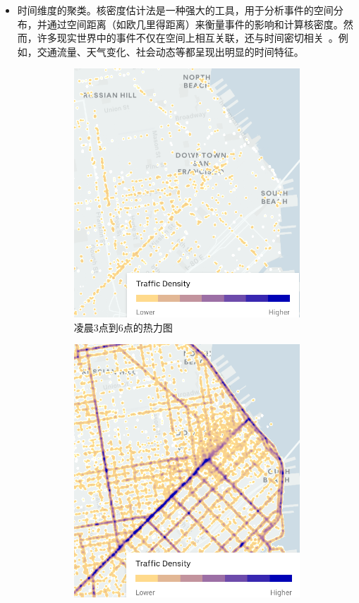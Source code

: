 \begin{itemize}[leftmargin=*]

	\item 时间维度的聚类。核密度估计法是一种强大的工具，用于分析事件的空间分布，并通过空间距离（如欧几里得距离）来衡量事件的影响和计算核密度。然而，许多现实世界中的事件不仅在空间上相互关联，还与时间密切相关~\cite{black_highway_1991}。例如，交通流量、天气变化、社会动态等都呈现出明显的时间特征。
	
	\begin{figure}[h!]
		\centering
		\begin{subfigure}{0.45\linewidth}
			\centering
			\includegraphics[width=0.8\linewidth]{figures/3a-6a-2020q1-RoadHeatmap-sanfrancisc.png}
			\caption{凌晨3点到6点的热力图}
			\label{subfig:morning_heatmap}
		\end{subfigure}
		\hspace{1em}
		\begin{subfigure}{0.45\linewidth}
			\centering
			\includegraphics[width=0.8\linewidth]{figures/3p-6p-2020q1-RoadHeatmap-sanfrancisc.png}

\end{subfigure}
\end{figure}
\end{itemize}
